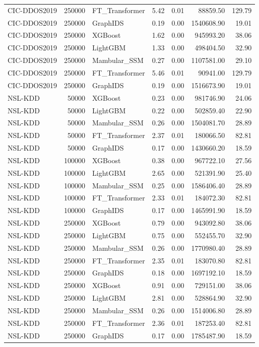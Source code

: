 \begin{table}[t]
\begin{tabular}{lrlrrrr}
CIC-DDOS2019 & 250000 & FT_Transformer & 5.42 & 0.01 & 88859.50 & 129.79 \\
CIC-DDOS2019 & 250000 & GraphIDS & 0.19 & 0.00 & 1540608.90 & 19.01 \\
CIC-DDOS2019 & 250000 & XGBoost & 1.62 & 0.00 & 945993.20 & 38.06 \\
CIC-DDOS2019 & 250000 & LightGBM & 1.33 & 0.00 & 498404.50 & 32.90 \\
CIC-DDOS2019 & 250000 & Mambular_SSM & 0.27 & 0.00 & 1107581.00 & 29.10 \\
CIC-DDOS2019 & 250000 & FT_Transformer & 5.46 & 0.01 & 90941.00 & 129.79 \\
CIC-DDOS2019 & 250000 & GraphIDS & 0.19 & 0.00 & 1516673.90 & 19.01 \\
NSL-KDD & 50000 & XGBoost & 0.23 & 0.00 & 981746.90 & 24.06 \\
NSL-KDD & 50000 & LightGBM & 0.22 & 0.00 & 502859.40 & 22.90 \\
NSL-KDD & 50000 & Mambular_SSM & 0.26 & 0.00 & 1504081.70 & 28.89 \\
NSL-KDD & 50000 & FT_Transformer & 2.37 & 0.01 & 180066.50 & 82.81 \\
NSL-KDD & 50000 & GraphIDS & 0.17 & 0.00 & 1430660.20 & 18.59 \\
NSL-KDD & 100000 & XGBoost & 0.38 & 0.00 & 967722.10 & 27.56 \\
NSL-KDD & 100000 & LightGBM & 2.65 & 0.00 & 521391.90 & 25.40 \\
NSL-KDD & 100000 & Mambular_SSM & 0.25 & 0.00 & 1586406.40 & 28.89 \\
NSL-KDD & 100000 & FT_Transformer & 2.33 & 0.01 & 184072.30 & 82.81 \\
NSL-KDD & 100000 & GraphIDS & 0.17 & 0.00 & 1465991.90 & 18.59 \\
NSL-KDD & 250000 & XGBoost & 0.79 & 0.00 & 943092.80 & 38.06 \\
NSL-KDD & 250000 & LightGBM & 0.75 & 0.00 & 552455.70 & 32.90 \\
NSL-KDD & 250000 & Mambular_SSM & 0.26 & 0.00 & 1770980.40 & 28.89 \\
NSL-KDD & 250000 & FT_Transformer & 2.35 & 0.01 & 183070.80 & 82.81 \\
NSL-KDD & 250000 & GraphIDS & 0.18 & 0.00 & 1697192.10 & 18.59 \\
NSL-KDD & 250000 & XGBoost & 0.91 & 0.00 & 729151.00 & 38.06 \\
NSL-KDD & 250000 & LightGBM & 2.81 & 0.00 & 528864.90 & 32.90 \\
NSL-KDD & 250000 & Mambular_SSM & 0.26 & 0.00 & 1514006.80 & 28.89 \\
NSL-KDD & 250000 & FT_Transformer & 2.36 & 0.01 & 187253.40 & 82.81 \\
NSL-KDD & 250000 & GraphIDS & 0.17 & 0.00 & 1785487.90 & 18.59 \\
\bottomrule
\end{tabular}

\end{table}
